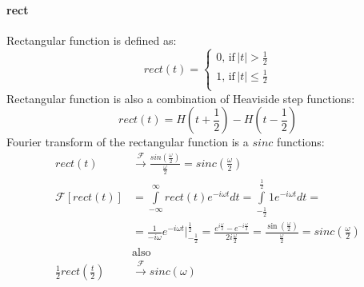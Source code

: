 \documentclass{article}
\begin{document}
\paragraph{rect} Rectangular function is defined as:
\begin{equation*}
    rect(t) = \begin{cases}
        0, \, \text{if} \, |t| > \frac{1}{2} \\
        1, \, \text{if} \, |t| \le \frac{1}{2} \\
    \end{cases} 
\end{equation*}
Rectangular function is also a combination of Heaviside step functions:
\begin{equation*}
    rect(t) = H(t+\frac{1}{2}) - H(t - \frac{1}{2})
\end{equation*}
Fourier transform of the rectangular function is a $sinc$ functions:
\begin{align*}
    rect(t) &\xrightarrow{\mathcal{F}} \frac{sin(\frac{\omega}{2})}{\frac{\omega}{2}} = sinc(\frac{\omega}{2}) \\
    \mathcal{F}[rect(t)] &=  \int \limits^{\infty}_{-\infty} rect(t) e^{-i \omega t}dt = \int \limits^{\frac{1}{2}}_{-\frac{1}{2}} 1 e^{-i \omega t}dt = \\
    &= \frac{1}{- i \omega}e^{-i \omega t} \Big|^{\frac{1}{2}}_{-\frac{1}{2}} = 
    \frac{e^{i\frac{\omega}{2}} - e^{-i\frac{\omega}{2}}}{2 i \frac{\omega}{2}} = \frac{\sin(\frac{\omega}{2})}{ \frac{\omega}{2}} = sinc(\frac{\omega}{2}) \\
    &\text{also} \,\\
    \frac{1}{2} rect(\frac{t}{2}) &\xrightarrow{\mathcal{F}} sinc(\omega)
\end{align*}
\end{document}
